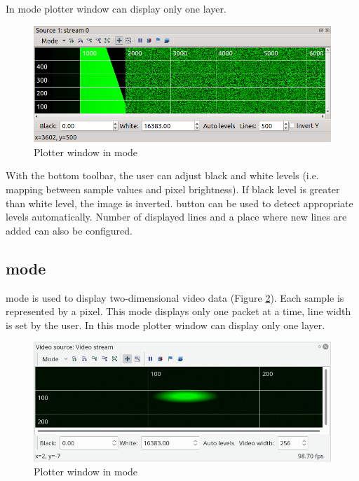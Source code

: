 \documentclass[a4paper,12pt,twoside,extrafontsizes]{memoir}
\begin{document}
In  mode plotter window can display only one layer.

\begin{figure}[htbp]
\centering
\includegraphics[scale=0.8]{images/plotterbitmap.png}
\caption{Plotter window in  mode}
\label{fig:plotterbitmap}
\end{figure}

With the bottom toolbar, the user can adjust black and white levels (i.e. mapping between sample values and pixel brightness). If black level is greater than white level, the image is inverted.  button can be used to detect appropriate levels automatically. Number of displayed lines and a place where new lines are added can also be configured.

\subsection{ mode}

 mode is used to display two-dimensional video data (Figure \ref{fig:plottervideo}). Each sample is represented by a pixel. This mode displays only one packet at a time, line width is set by the user. In this mode plotter window can display only one layer.

\begin{figure}[htbp]
\centering
\includegraphics[scale=0.8058]{images/plottervideo.png}
\caption{Plotter window in  mode}
\label{fig:plottervideo}
\end{figure}
\end{document}
